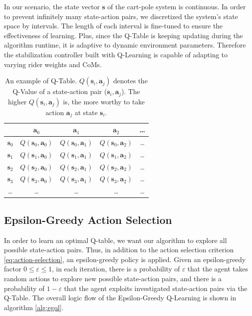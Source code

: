 \documentclass[10pt,a4paper]{article}
\begin{document}
	In our scenario, the state vector $\boldsymbol{s}$ of the cart-pole system is continuous. In order to prevent infinitely many state-action pairs, we discretized the system's state space by intervals. The length of each interval is fine-tuned to ensure the effectiveness of learning. Plus, since the Q-Table is keeping updating during the algorithm runtime, it is adaptive to dynamic environment parameters. Therefore the stabilization controller built with Q-Learning is capable of adapting to varying rider weights and CoMs.
	
	\begin{table}
		\centering
		\begin{tabular}{|c|c|c|c|c|}
			\hline
			\diagbox{States}{Actions}& $\boldsymbol{a}_{0}$ & $\boldsymbol{a}_{1}$ & $\boldsymbol{a}_{2}$ & \dots \\
			\hline
			$\boldsymbol{s}_{0}$ & $Q(\boldsymbol{s}_{0}, \boldsymbol{a}_{0})$ & $Q(\boldsymbol{s}_{0}, \boldsymbol{a}_{1})$ & $Q(\boldsymbol{s}_{0}, \boldsymbol{a}_{2})$ & \dots \\
			\hline
			$\boldsymbol{s}_{1}$ & $Q(\boldsymbol{s}_{1}, \boldsymbol{a}_{0})$ & $Q(\boldsymbol{s}_{1}, \boldsymbol{a}_{1})$ & $Q(\boldsymbol{s}_{1}, \boldsymbol{a}_{2})$ & \dots \\
			\hline
			$\boldsymbol{s}_{2}$ &$Q(\boldsymbol{s}_{2}, \boldsymbol{a}_{0})$ & $Q(\boldsymbol{s}_{2}, \boldsymbol{a}_{1})$ & $Q(\boldsymbol{s}_{2}, \boldsymbol{a}_{2})$ & \dots \\
			\hline
			$\boldsymbol{s}_{3}$ & $Q(\boldsymbol{s}_{3}, \boldsymbol{a}_{0})$ & $Q(\boldsymbol{s}_{3}, \boldsymbol{a}_{1})$ & $Q(\boldsymbol{s}_{3}, \boldsymbol{a}_{2})$ & \dots \\
			\hline
			\dots & \dots & \dots & \dots & \dots \\
			\hline
		\end{tabular}
		\caption{An example of Q-Table. $Q(\boldsymbol{s}_{i}, \boldsymbol{a}_{j})$ denotes the Q-Value of a state-action pair ($\boldsymbol{s}_{i}, \boldsymbol{a}_{j}$). The higher $Q(\boldsymbol{s}_{i}, \boldsymbol{a}_{j})$ is, the more worthy to take action $\boldsymbol{a}_{j}$ at state $\boldsymbol{s}_{i}$. } 
		\label{tab:q-table}
	\end{table}
	
	\subsection{Epsilon-Greedy Action Selection}
	In order to learn an optimal Q-table, we want our algorithm to explore all possible state-action pairs. Thus, in addition to the action selection criterion \eqref{eq:action-selection},  an epsilon-greedy policy is applied. Given an epsilon-greedy factor $0 \le \varepsilon \le 1$, in each iteration, there is a probability of $\varepsilon$ that the agent takes random actions to explore new possible state-action pairs, and there is a probability of $1 - \varepsilon$ that the agent exploits investigated state-action pairs via the Q-Table. The overall logic flow of the Epsilon-Greedy Q-Learning is shown in algorithm \ref{alg:egql}. 
	
\end{document}

